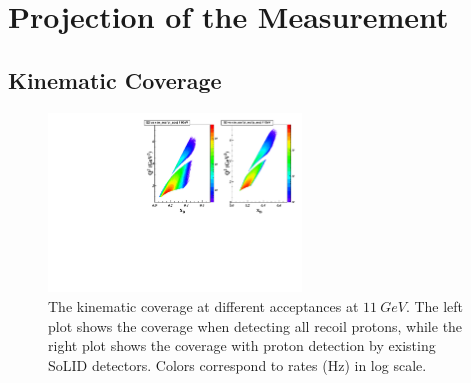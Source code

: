 \section{Projection of the Measurement}
\subsection{Kinematic Coverage}
\begin{figure}[!ht]
 \begin{center}
      \includegraphics[type=pdf, ext=.pdf,read=.pdf,width=0.6\textwidth]{./figures/E11_Q2_x_epip_Q2gt1}
 \caption[The kinematic coverage at different acceptances]{\footnotesize{The kinematic coverage at different acceptances at $11~GeV$. The left plot shows the coverage when detecting all recoil protons, while the right plot shows the coverage with proton detection by existing SoLID detectors. Colors correspond to rates (Hz) in log scale.}}
  \label{kin_cor}
  \end{center}
\end{figure}
